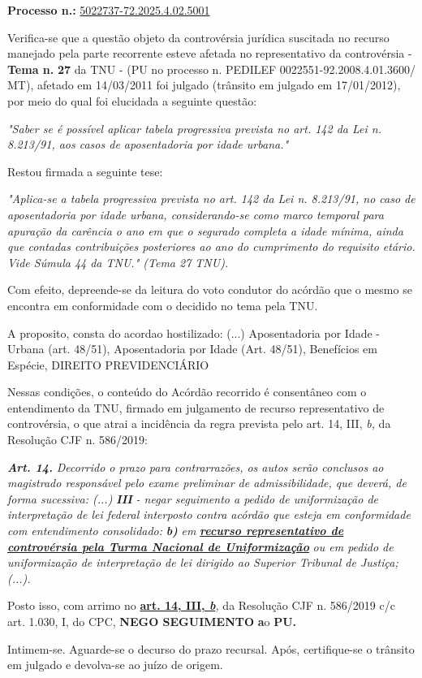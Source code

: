 \documentclass[12pt]{article}
\begin{document}
\justifying
\noindent \textbf{Processo n.: }\uline{5022737-72.2025.4.02.5001}

\noindent Verifica-se que a questão objeto da controvérsia jurídica suscitada no recurso manejado pela parte recorrente esteve afetada no representativo da controvérsia - \textbf{Tema n. }\textbf{27} da TNU - (PU no processo n. PEDILEF 0022551-92.2008.4.01.3600/ MT),  afetado em 14/03/2011 foi julgado (trânsito em julgado em 17/01/2012), por meio do qual foi elucidada a seguinte questão:

{\leftskip=3.1cm\rightskip=0.8cm\parindent=0pt \textit{"Saber se é possível aplicar tabela progressiva prevista no art. 142 da Lei n. 8.213/91, aos casos de aposentadoria por idade urbana."}\par}

\noindent Restou firmada a seguinte tese:

{\leftskip=3.1cm\rightskip=0.8cm\parindent=0pt \textit{"Aplica-se a tabela progressiva prevista no art. 142 da Lei n. 8.213/91, no caso de aposentadoria por idade urbana, considerando-se como marco temporal para apuração da carência o ano em que o segurado completa a idade mínima, ainda que contadas contribuições posteriores ao ano do cumprimento do requisito etário. Vide Súmula 44 da TNU." (Tema 27 TNU).}\par}

\noindent Com efeito, depreende-se da leitura do voto condutor do acórdão que o mesmo se encontra em conformidade com o decidido no  tema pela TNU.

\noindent A proposito, consta do acordao hostilizado: (...) Aposentadoria por Idade - Urbana (art. 48/51), Aposentadoria por Idade (Art. 48/51), Benefícios em Espécie, DIREITO PREVIDENCIÁRIO

\noindent Nessas condições, o conteúdo do Acórdão recorrido é consentâneo com o entendimento da TNU, firmado em julgamento de recurso representativo de controvérsia, o que atrai a incidência da regra prevista pelo art. 14, III, \textit{b,} da Resolução CJF n. 586/2019:

\noindent \textit{\textbf{Art. 14.}}\textit{ Decorrido o prazo para contrarrazões, os autos serão conclusos ao magistrado responsável pelo exame preliminar de admissibilidade, que deverá, de forma sucessiva: (...) }\textit{\textbf{III }}\textit{- negar seguimento a pedido de uniformização de interpretação de lei federal interposto contra acórdão que esteja em conformidade com entendimento consolidado: }\textit{\textbf{b)}}\textit{ em }\textit{\textbf{\uline{recurso representativo de controvérsia pela Turma Nacional de Uniformização}}}\textit{ ou em pedido de uniformização de interpretação de lei dirigido ao Superior Tribunal de Justiça;(...).}

\noindent Posto isso, com arrimo no \textbf{\uline{art. 14, III, }}\textit{\textbf{\uline{b}}}\textit{,} da Resolução CJF n. 586/2019 c/c art. 1.030, I, do CPC, \textbf{NEGO SEGUIMENTO }\textbf{a}o\textbf{ PU}\textbf{.}

\noindent Intimem-se. Aguarde-se o decurso do prazo recursal. Após, certifique-se o trânsito em julgado e devolva-se ao juízo de origem.
\end{document}
